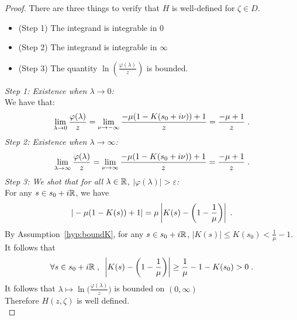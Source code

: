 \documentclass[11pt]{amsart}
\begin{document}
\begin{proof}
There are three things to verify that $H$ is well-defined for $\zeta \in D$. 
\begin{itemize}
    \item (Step 1) The integrand is integrable in $0$
    \item (Step 2) The integrand is integrable in $\infty$
    \item  (Step 3) The quantity $\ln\left(\frac{\varphi(\lambda)}{z} \right)$ is bounded. 
\end{itemize}
\textit{Step 1: Existence when $\lambda \to 0$:}\\
We have that: 
\begin{align*}
    \lim_{\lambda \to 0}\frac{\varphi(\lambda)}{z} = \lim_{\nu\to-\infty}\frac{-\mu(1-K(s_0+i\nu))+1}{z} = \frac{-\mu+1}{z}
    \; .
\end{align*}
\textit{Step 2: Existence when $\lambda \to \infty$:}
\begin{align*}
    \lim_{\lambda \to \infty}\frac{\varphi(\lambda)}{z} = \lim_{\nu\to\infty}\frac{-\mu(1-K(s_0+i\nu))+1}{z} = \frac{-\mu+1}{z}
    \; .
\end{align*}
\textit{Step 3: We shot that for all $\lambda \in \mathbb{R}$, $|\varphi(\lambda)| > \varepsilon$: }\\
For any $s \in s_0 + i\mathbb{R}$, we have
    \begin{align*}
        |-\mu(1-K(s))+1| 
        = \mu \left|K(s) - \left(1-\frac{1}{\mu}\right)\right|
        \; .
    \end{align*}
By Assumption~\ref{hyp:boundK}, for any $s \in s_0 + i\mathbb{R}$, $|K(s)| \leq K(s_0) < \frac{1}{\mu} - 1$. It follows that
\begin{align*}
    \forall s \in s_0 + i\mathbb{R}
    \; , \enspace
    \left|K(s) - \left(1-\frac{1}{\mu}\right)\right| \geq \frac{1}\mu - 1 - K(s_0) > 0
    \; .
\end{align*}
It follows that $\lambda \mapsto \ln\Big(\frac{\varphi(\lambda)}{z}\Big)$ is bounded on $(0, \infty)$\\

Therefore
$H(z,\zeta)$ is well defined.\\


\end{proof}
\end{document}
